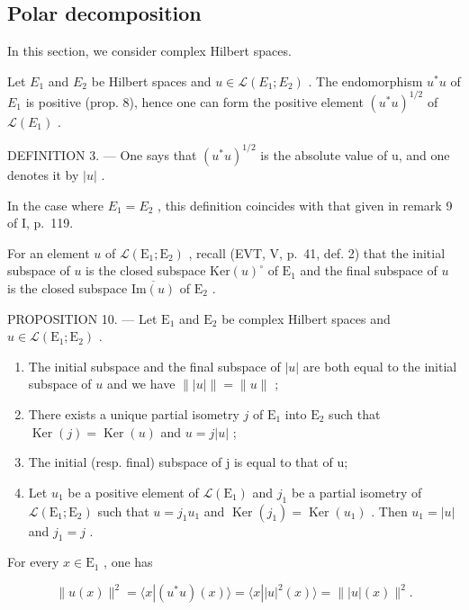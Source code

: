 \subsection{Polar decomposition}

In this section, we consider complex Hilbert spaces.

Let \(E_{1}\) and \(E_{2}\) be Hilbert spaces and \(u \in \mathcal{L}(E_{1}; E_{2})\) . The endomorphism \(u^{*}u\) of \(E_{1}\) is positive (prop. 8), hence one can form the positive element \((u^{*}u)^{1/2}\) of \(\mathcal{L}(E_{1})\) .

DEFINITION 3. --- One says that \((u^{*}u)^{1/2}\) is the absolute value of u, and one denotes it by \(|u|\) .

In the case where \(E_{1} = E_{2}\) , this definition coincides with that given in remark 9 of I, p.~119.

For an element \(u\) of \(\mathcal{L}(\mathrm{E}_{1};\mathrm{E}_{2})\) , recall (EVT, V, p.~41, def. 2) that the initial subspace of \(u\) is the closed subspace \(\mathrm{Ker}(u)^{\circ}\) of \(\mathrm{E}_{1}\) and the final subspace of \(u\) is the closed subspace \(\overline{\mathrm{Im}(u)}\) of \(\mathrm{E}_{2}\) .

PROPOSITION 10. --- Let \(\mathrm{E}_1\) and \(\mathrm{E}_2\) be complex Hilbert spaces and \(u \in \mathcal{L}(\mathrm{E}_1; \mathrm{E}_2)\) .

\begin{enumerate}
\def\labelenumi{\alph{enumi})}
\item
  The initial subspace and the final subspace of \(|u|\) are both equal to the initial subspace of \(u\) and we have \(\| |u| \| = \| u\|\) ;
\item
  There exists a unique partial isometry \(j\) of \(\mathrm{E}_1\) into \(\mathrm{E}_2\) such that \(\operatorname{Ker}(j) = \operatorname{Ker}(u)\) and \(u = j|u|\) ;
\item
  The initial (resp. final) subspace of j is equal to that of u;
\item
  Let \(u_{1}\) be a positive element of \(\mathcal{L}(\mathrm{E}_{1})\) and \(j_{1}\) be a partial isometry of \(\mathcal{L}(\mathrm{E}_{1};\mathrm{E}_{2})\) such that \(u = j_{1}u_{1}\) and \(\operatorname{Ker}(j_{1}) = \operatorname{Ker}(u_{1})\) . Then \(u_{1} = |u|\) and \(j_{1} = j\) .
\end{enumerate}

For every \(x\in \mathrm{E}_1\) , one has

\[
\| u (x) \| ^ {2} = \langle x | (u ^ {*} u) (x) \rangle = \langle x | | u | ^ {2} (x) \rangle = \| | u | (x) \| ^ {2}.\tag{2}
\]


